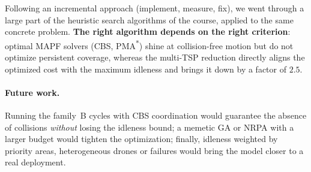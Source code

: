 \documentclass[11pt,a4paper]{article}
\begin{document}
Following an incremental approach (implement, measure, fix), we went through a
large part of the heuristic search algorithms of the course, applied to the same
concrete problem. \textbf{The right algorithm depends on the right criterion}:
optimal MAPF solvers (CBS, PMA\textsuperscript{*}) shine at collision-free motion
but do not optimize persistent coverage, whereas the multi-TSP reduction directly
aligns the optimized cost with the maximum idleness and brings it down by a
factor of $2.5$.

\paragraph{Future work.} Running the family~B cycles with CBS coordination would
guarantee the absence of collisions \emph{without} losing the idleness bound; a
memetic GA or NRPA with a larger budget would tighten the optimization; finally,
idleness weighted by priority areas, heterogeneous drones or failures would bring
the model closer to a real deployment.
\end{document}
